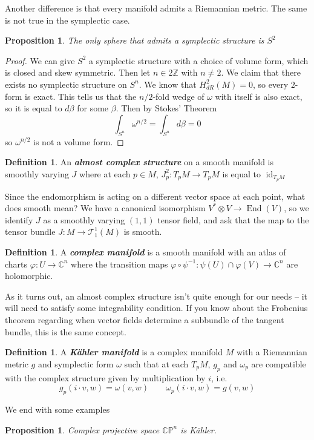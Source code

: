 \documentclass[psamsfonts]{amsart}
\newtheorem{prop}[thm]{Proposition}
\theoremstyle{definition}
\newtheorem{defn}[thm]{Definition}
\theoremstyle{remark}
\newcommand{\ib}[1]{\textbf{\textit{#1}}}
\newcommand{\Z}{\mathbb{Z}}
\newcommand{\C}{\mathbb{C}}
\newcommand{\CP}{\mathbb{CP}}
\newcommand{\inv}{^{-1}}
\DeclareMathOperator{\id}{id}
\DeclareMathOperator{\End}{End}
\begin{document}
Another difference is that every manifold admits a Riemannian metric. The same is not true in the symplectic case. 
\begin{prop}
The only sphere that admits a symplectic structure is $S^2$
\end{prop}
%
\begin{proof}
We can give $S^2$ a symplectic structure with a choice of volume form, which is closed and skew symmetric. Then let $n \in 2\Z$ with $n \neq 2$. We claim that there exists no symplectic structure on $S^n$. We know that $H^2_{dR}(M) = 0$, so every $2$-form is exact. This tells us that the $n/2$-fold wedge of $\omega$ with itself is also exact, so it is equal to $d\beta$ for some $\beta$. Then by Stokes' Theorem
$$\int_{S^n} \omega^{n/2} = \int_{S^n} d\beta = 0 $$
so $\omega^{n/2}$ is not a volume form.
\end{proof}
%
\begin{defn}
An \ib{almost complex structure} on a smooth manifold is smoothly varying $J$ where at each $p \in M$, $J_p^2: T_pM \to T_pM$ is equal to $\id_{T_pM}$
\end{defn}
Since the endomorphism is acting on a different vector space at each point, what does smooth mean? We have a canonical isomorphism $V^* \otimes V \to \End(V)$, so we identify $J$ as a smoothly varying $(1,1)$ tensor field, and ask that the map to the tensor bundle $J: M \to \mathcal{T}^1_1(M)$ is smooth.
%
\begin{defn}
A \ib{complex manifold} is a smooth manifold with an atlas of charts $\varphi: U \to \C^n$ where the transition maps $\varphi \circ \psi\inv : \psi(U) \cap \varphi(V) \to \C^n$ are holomorphic.
\end{defn}
%
As it turns out, an almost complex structure isn't quite enough for our needs -- it will need to satisfy some integrability condition. If you know about the Frobenius theorem regarding when vector fields determine a subbundle of the tangent bundle, this is the same concept.
%
\begin{defn}
A \ib{K\"ahler manifold} is a complex manifold $M$ with a Riemannian metric $g$ and symplectic form $\omega$ such that at each $T_pM$, $g_p$ and $\omega_p$ are compatible with the complex structure given by multiplication by $i$, i.e.
$$g_p(i\cdot v,w) = \omega(v,w) \qquad \omega_p(i\cdot v,w) = g(v,w) $$
\end{defn}
%
We end with some examples
\begin{prop}
Complex projective space $\CP^n$ is K\"ahler.
\end{prop}
\end{document}
